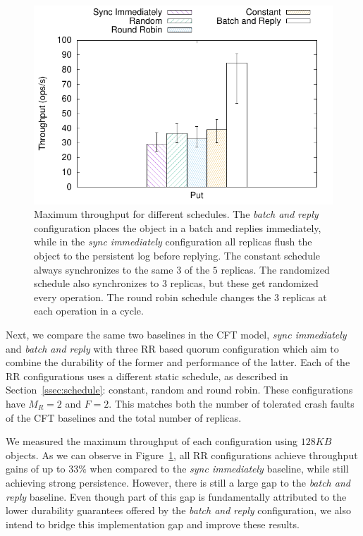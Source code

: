 \begin{figure}[t]
    \centering
    \includegraphics[width=.70\linewidth]{r2s2_results/rr_small/tput.pdf}
    \caption{Maximum throughput for different schedules.
    The \emph{batch and reply} configuration places the
    object in a batch and replies immediately, while in the
    \emph{sync immediately} configuration all replicas
    flush the object to the persistent log before replying. The
    constant schedule always synchronizes to the same $3$ of the
    $5$ replicas. The randomized schedule also synchronizes to
    $3$ replicas, but these get randomized every operation. The
    round robin schedule changes the $3$ replicas at each
    operation in a cycle.}\label{fig:r2s2_sched}
\end{figure}

Next, we compare the same two baselines in the
\ac{CFT} model, \emph{sync immediately} and \emph{batch and reply} with three \ac{RR} based quorum
configuration which aim to combine the durability of the former and
performance of the latter. Each of the \ac{RR} configurations
uses a different static schedule, as described in
Section~\ref{ssec:schedule}: constant, random and round robin.
These configurations have $M_R = 2$ and $F = 2$. This matches
both the number of tolerated crash faults of the \ac{CFT}
baselines and the total number of replicas.

We measured the maximum throughput of each configuration using  $128KB$ objects.
As we can observe in Figure~\ref{fig:r2s2_sched}, all \ac{RR}
configurations achieve throughput gains of up to $33\%$ when compared to the
\emph{sync immediately} baseline, while still achieving strong
persistence. However, there is still a large gap to the
\emph{batch and reply} baseline. Even though part of this gap is fundamentally attributed to the
lower durability guarantees offered by the \emph{batch and reply}
configuration, we also intend to bridge this implementation gap and
improve these results.
